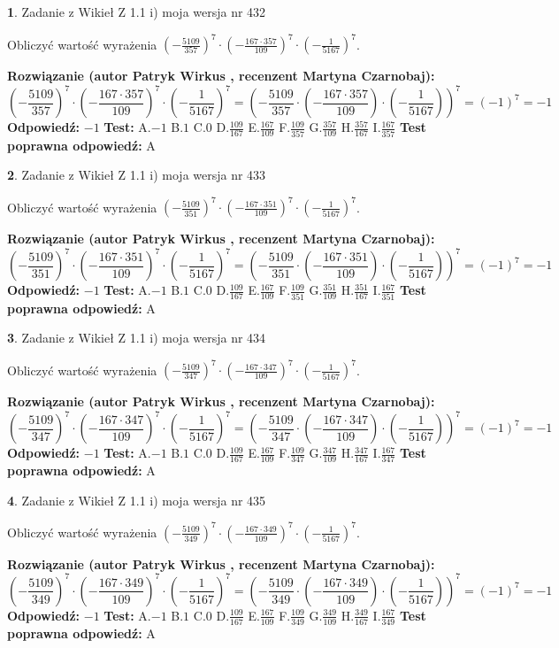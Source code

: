 \documentclass[12pt, a4paper]{article}
\theoremstyle{definition} %
\newtheorem{zad}{}
\newcommand{\zadStart}[1]{\begin{zad}#1\newline}
\newcommand{\zadStop}{\end{zad}}
\newcommand{\rozwStart}[2]{\noindent \textbf{Rozwiązanie (autor #1 , recenzent #2): }\newline}
\newcommand{\rozwStop}{\newline}
\newcommand{\odpStart}{\noindent \textbf{Odpowiedź:}\newline}
\newcommand{\odpStop}{\newline}
\newcommand{\testStart}{\noindent \textbf{Test:}\newline}
\newcommand{\testStop}{\newline}
\newcommand{\kluczStart}{\noindent \textbf{Test poprawna odpowiedź:}\newline}
\newcommand{\kluczStop}{\newline}
\begin{document}
\zadStart{Zadanie z Wikieł Z 1.1 i) moja wersja nr 432}

Obliczyć wartość wyrażenia $(-\frac{5109}{357})^{7} \cdot (-\frac{167 \cdot 357}{109})^{7} \cdot (-\frac{1}{5167})^{7}$.
\zadStop
\rozwStart{Patryk Wirkus}{Martyna Czarnobaj}
$$(-\frac{5109}{357})^{7} \cdot (-\frac{167 \cdot 357}{109})^{7} \cdot (-\frac{1}{5167})^{7} = (-\frac{5109}{357} \cdot (-\frac{167 \cdot 357}{109}) \cdot (-\frac{1}{5167}))^{7} = (-1)^{7} = -1$$
\rozwStop
\odpStart
$-1$
\odpStop
\testStart
A.$-1$ B.$1$ C.$0$ D.$\frac{109}{167}$ E.$\frac{167}{109}$
F.$\frac{109}{357}$ G.$\frac{357}{109}$
H.$\frac{357}{167}$
I.$\frac{167}{357}$
\testStop
\kluczStart
A
\kluczStop



\zadStart{Zadanie z Wikieł Z 1.1 i) moja wersja nr 433}

Obliczyć wartość wyrażenia $(-\frac{5109}{351})^{7} \cdot (-\frac{167 \cdot 351}{109})^{7} \cdot (-\frac{1}{5167})^{7}$.
\zadStop
\rozwStart{Patryk Wirkus}{Martyna Czarnobaj}
$$(-\frac{5109}{351})^{7} \cdot (-\frac{167 \cdot 351}{109})^{7} \cdot (-\frac{1}{5167})^{7} = (-\frac{5109}{351} \cdot (-\frac{167 \cdot 351}{109}) \cdot (-\frac{1}{5167}))^{7} = (-1)^{7} = -1$$
\rozwStop
\odpStart
$-1$
\odpStop
\testStart
A.$-1$ B.$1$ C.$0$ D.$\frac{109}{167}$ E.$\frac{167}{109}$
F.$\frac{109}{351}$ G.$\frac{351}{109}$
H.$\frac{351}{167}$
I.$\frac{167}{351}$
\testStop
\kluczStart
A
\kluczStop



\zadStart{Zadanie z Wikieł Z 1.1 i) moja wersja nr 434}

Obliczyć wartość wyrażenia $(-\frac{5109}{347})^{7} \cdot (-\frac{167 \cdot 347}{109})^{7} \cdot (-\frac{1}{5167})^{7}$.
\zadStop
\rozwStart{Patryk Wirkus}{Martyna Czarnobaj}
$$(-\frac{5109}{347})^{7} \cdot (-\frac{167 \cdot 347}{109})^{7} \cdot (-\frac{1}{5167})^{7} = (-\frac{5109}{347} \cdot (-\frac{167 \cdot 347}{109}) \cdot (-\frac{1}{5167}))^{7} = (-1)^{7} = -1$$
\rozwStop
\odpStart
$-1$
\odpStop
\testStart
A.$-1$ B.$1$ C.$0$ D.$\frac{109}{167}$ E.$\frac{167}{109}$
F.$\frac{109}{347}$ G.$\frac{347}{109}$
H.$\frac{347}{167}$
I.$\frac{167}{347}$
\testStop
\kluczStart
A
\kluczStop



\zadStart{Zadanie z Wikieł Z 1.1 i) moja wersja nr 435}

Obliczyć wartość wyrażenia $(-\frac{5109}{349})^{7} \cdot (-\frac{167 \cdot 349}{109})^{7} \cdot (-\frac{1}{5167})^{7}$.
\zadStop
\rozwStart{Patryk Wirkus}{Martyna Czarnobaj}
$$(-\frac{5109}{349})^{7} \cdot (-\frac{167 \cdot 349}{109})^{7} \cdot (-\frac{1}{5167})^{7} = (-\frac{5109}{349} \cdot (-\frac{167 \cdot 349}{109}) \cdot (-\frac{1}{5167}))^{7} = (-1)^{7} = -1$$
\rozwStop
\odpStart
$-1$
\odpStop
\testStart
A.$-1$ B.$1$ C.$0$ D.$\frac{109}{167}$ E.$\frac{167}{109}$
F.$\frac{109}{349}$ G.$\frac{349}{109}$
H.$\frac{349}{167}$
I.$\frac{167}{349}$
\testStop
\kluczStart
A
\kluczStop
\end{document}
